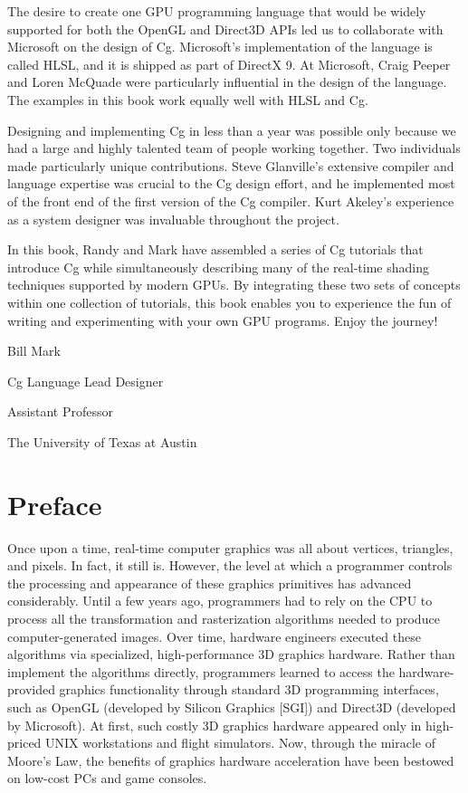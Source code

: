 \documentclass{book}
\begin{document}
The desire to create one GPU programming language that would be widely supported for both the OpenGL and Direct3D APIs led us to collaborate with Microsoft on the design of Cg. Microsoft's implementation of the language is called HLSL, and it is shipped as part of DirectX 9. At Microsoft, Craig Peeper and Loren McQuade were particularly influential in the design of the language. The examples in this book work equally well with HLSL and Cg.

Designing and implementing Cg in less than a year was possible only because we had a large and highly talented team of people working together. Two individuals made particularly unique contributions. Steve Glanville's extensive compiler and language expertise was crucial to the Cg design effort, and he implemented most of the front end of the first version of the Cg compiler. Kurt Akeley's experience as a system designer was invaluable throughout the project.

In this book, Randy and Mark have assembled a series of Cg tutorials that introduce Cg while simultaneously describing many of the real-time shading techniques supported by modern GPUs. By integrating these two sets of concepts within one collection of tutorials, this book enables you to experience the fun of writing and experimenting with your own GPU programs. Enjoy the journey!

Bill Mark

Cg Language Lead Designer

Assistant Professor

The University of Texas at Austin

\chapter*{Preface}

Once upon a time, real-time computer graphics was all about vertices, triangles, and pixels. In fact, it still is. However, the level at which a programmer controls the processing and appearance of these graphics primitives has advanced considerably. Until a few years ago, programmers had to rely on the CPU to process all the transformation and rasterization algorithms needed to produce computer-generated images. Over time, hardware engineers executed these algorithms via specialized, high-performance 3D graphics hardware. Rather than implement the algorithms directly, programmers learned to access the hardware-provided graphics functionality through standard 3D programming interfaces, such as OpenGL (developed by Silicon Graphics [SGI]) and Direct3D (developed by Microsoft). At first, such costly 3D graphics hardware appeared only in high-priced UNIX workstations and flight simulators. Now, through the miracle of Moore's Law, the benefits of graphics hardware acceleration have been bestowed on low-cost PCs and game consoles.
\end{document}
